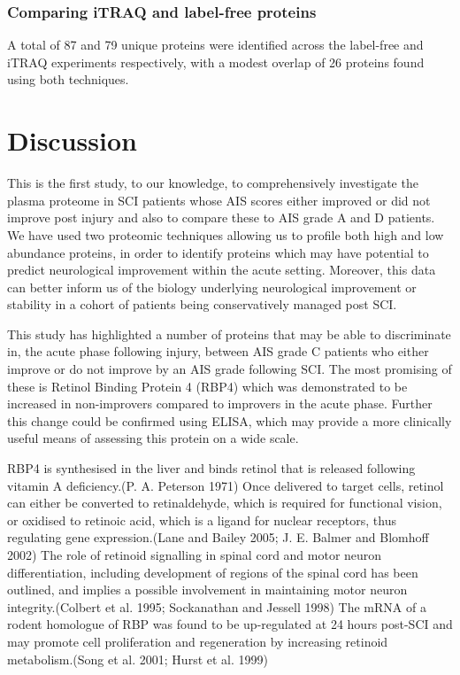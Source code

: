 \documentclass[9pt,lineno]{elife}
\begin{document}
\begin{landscape}
\begin{landscape}
{\subsubsection{Comparing iTRAQ and label-free proteins}\label{comparing-itraq-and-label-free-proteins}}

A total of 87 and 79 unique proteins were identified across the label-free and iTRAQ experiments respectively, with a modest overlap of 26 proteins found using both techniques.



\hypertarget{discussion}{%
\section{Discussion}\label{discussion}}

This is the first study, to our knowledge, to comprehensively investigate the plasma proteome in SCI patients whose AIS scores either improved or did not improve post injury and also to compare these to AIS grade A and D patients.
We have used two proteomic techniques allowing us to profile both high and low abundance proteins, in order to identify proteins which may have potential to predict neurological improvement within the acute setting.
Moreover, this data can better inform us of the biology underlying neurological improvement or stability in a cohort of patients being conservatively managed post SCI.

This study has highlighted a number of proteins that may be able to discriminate in, the acute phase following injury, between AIS grade C patients who either improve or do not improve by an AIS grade following SCI.
The most promising of these is Retinol Binding Protein 4 (RBP4) which was demonstrated to be increased in non-improvers compared to improvers in the acute phase.
Further this change could be confirmed using ELISA, which may provide a more clinically useful means of assessing this protein on a wide scale.

RBP4 is synthesised in the liver and binds retinol that is released following vitamin A deficiency.(P. A. Peterson 1971) Once delivered to target cells, retinol can either be converted to retinaldehyde, which is required for functional vision, or oxidised to retinoic acid, which is a ligand for nuclear receptors, thus regulating gene expression.(Lane and Bailey 2005; J. E. Balmer and Blomhoff 2002) The role of retinoid signalling in spinal cord and motor neuron differentiation, including development of regions of the spinal cord has been outlined, and implies a possible involvement in maintaining motor neuron integrity.(Colbert et al. 1995; Sockanathan and Jessell 1998) The mRNA of a rodent homologue of RBP was found to be up-regulated at 24 hours post-SCI and may promote cell proliferation and regeneration by increasing retinoid metabolism.(Song et al. 2001; Hurst et al. 1999)


\end{landscape}
\end{landscape}
\end{document}
